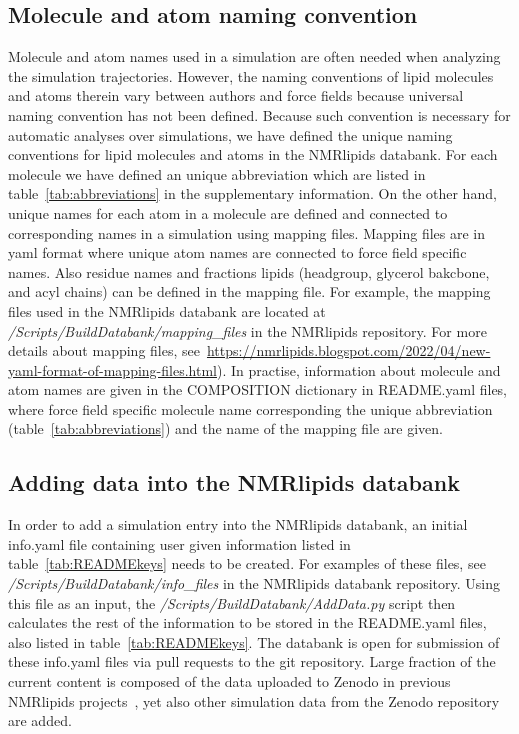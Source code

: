 \documentclass[fleqn,10pt]{wlscirep}
\begin{document}
\subsection{Molecule and atom naming convention} \label{naming}
Molecule and atom names used in a simulation are often needed when analyzing the simulation trajectories. However, the naming conventions of lipid molecules and atoms therein vary between authors and force fields because universal naming convention has not been defined. Because such convention is necessary for automatic analyses over simulations, we have defined the unique naming conventions for lipid molecules and atoms in the NMRlipids databank. For each molecule we have defined an unique abbreviation which are listed in table~\ref{tab:abbreviations} in the supplementary information. On the other hand, unique names for each atom in a molecule are defined and connected to corresponding names in a simulation using mapping files. Mapping files are in yaml format where unique atom names are connected to force field specific names. Also residue names and fractions lipids (headgroup, glycerol bakcbone, and acyl chains) can be defined in the mapping file. For example, the mapping files used in the NMRlipids databank are located at {\it /Scripts/BuildDatabank/mapping\_files} in the NMRlipids repository. For more details about mapping files, see~\url{https://nmrlipids.blogspot.com/2022/04/new-yaml-format-of-mapping-files.html}). In practise, information about molecule and atom names are given in the COMPOSITION dictionary in README.yaml files, where force field specific molecule name corresponding the unique abbreviation (table~\ref{tab:abbreviations}) and the name of the mapping file are given. 


\subsection{Adding data into the NMRlipids databank}
In order to add a simulation entry into the NMRlipids databank, an initial info.yaml file containing user given information listed in table~\ref{tab:READMEkeys} needs to be created. For examples of these files, see {\it /Scripts/BuildDatabank/info\_files} in the NMRlipids databank repository. Using this file as an input, the {\it /Scripts/BuildDatabank/AddData.py} script then calculates the rest of the information to be stored in the README.yaml files, also listed in table~\ref{tab:READMEkeys}. The databank is open for submission of these info.yaml files via pull requests to the git repository. Large fraction of the current content is composed of the data uploaded to Zenodo in previous NMRlipids projects~\cite{botan15,catte16,antila19,bacle21}, yet also other simulation data from the Zenodo repository are added.
\end{document}
